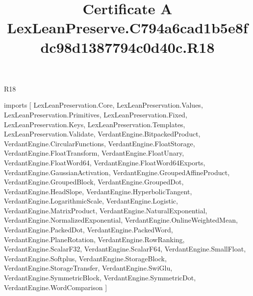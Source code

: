 \begin{lexlean}{R18}
\title{Certificate A LexLeanPreserve.C794a6cad1b5e8fdc98d1387794c0d40c.R18}
\begin{coremodule}
imports [
  LexLeanPreservation.Core,
  LexLeanPreservation.Values,
  LexLeanPreservation.Primitives,
  LexLeanPreservation.Fixed,
  LexLeanPreservation.Keys,
  LexLeanPreservation.Templates,
  LexLeanPreservation.Validate,
  VerdantEngine.BitpackedProduct,
  VerdantEngine.CircularFunctions,
  VerdantEngine.FloatStorage,
  VerdantEngine.FloatTransform,
  VerdantEngine.FloatUnary,
  VerdantEngine.FloatWord64,
  VerdantEngine.FloatWord64Exports,
  VerdantEngine.GaussianActivation,
  VerdantEngine.GroupedAffineProduct,
  VerdantEngine.GroupedBlock,
  VerdantEngine.GroupedDot,
  VerdantEngine.HeadSlope,
  VerdantEngine.HyperbolicTangent,
  VerdantEngine.LogarithmicScale,
  VerdantEngine.Logistic,
  VerdantEngine.MatrixProduct,
  VerdantEngine.NaturalExponential,
  VerdantEngine.NormalizedExponential,
  VerdantEngine.OnlineWeightedMean,
  VerdantEngine.PackedDot,
  VerdantEngine.PackedWord,
  VerdantEngine.PlaneRotation,
  VerdantEngine.RowRanking,
  VerdantEngine.ScalarF32,
  VerdantEngine.ScalarF64,
  VerdantEngine.SmallFloat,
  VerdantEngine.Softplus,
  VerdantEngine.StorageBlock,
  VerdantEngine.StorageTransfer,
  VerdantEngine.SwiGlu,
  VerdantEngine.SymmetricBlock,
  VerdantEngine.SymmetricDot,
  VerdantEngine.WordComparison
]


\end{coremodule}
\end{lexlean}
